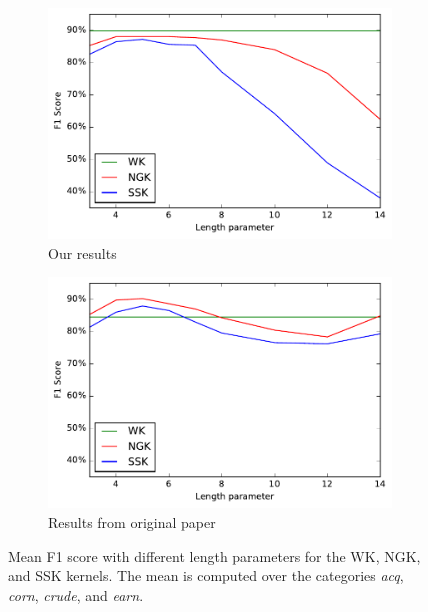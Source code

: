 \begin{figure}[H]
  \centering
  \begin{subfigure}{0.5\textwidth}
    \centering
    \includegraphics[width=1.0\linewidth]{figures/ours.pdf}
    \caption{Our results}
    \label{fig:ours}
  \end{subfigure}%
  \begin{subfigure}{0.5\textwidth}
    \centering
    \includegraphics[width=1.0\linewidth]{figures/theirs.pdf}
    \caption{Results from original paper}
    \label{fig:theirs}
  \end{subfigure}
  \caption{Mean F1 score with different length parameters for the WK, NGK, and SSK kernels. The mean is computed over the categories \textit{acq}, \textit{corn}, \textit{crude}, and \textit{earn}.}
  \label{fig:oursvstheirs}
\end{figure}
